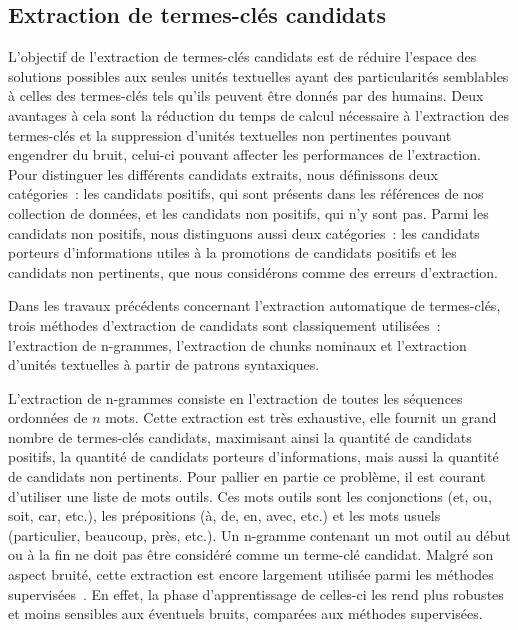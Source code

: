   \subsection{Extraction de termes-clés candidats}
  \label{subsec:extraction_de_termes_cles_candidats}
    L'objectif de l'extraction de termes-clés candidats est de réduire l'espace
    des solutions possibles aux seules unités textuelles ayant des
    particularités semblables à celles des termes-clés tels qu'ils peuvent être
    donnés par des humains. Deux avantages à cela sont la réduction du temps de
    calcul nécessaire à l'extraction des termes-clés et la suppression d'unités
    textuelles non pertinentes pouvant engendrer du bruit, celui-ci pouvant
    affecter les performances de l'extraction. Pour distinguer les différents
    candidats extraits, nous définissons deux catégories~: les candidats
    positifs, qui sont présents dans les références de nos collection de
    données, et les candidats non positifs, qui n'y sont pas. Parmi les
    candidats non positifs, nous distinguons aussi deux catégories~: les
    candidats porteurs d'informations utiles à la promotions de candidats
    positifs et les candidats non pertinents, que nous considérons comme des
    erreurs d'extraction.

    Dans les travaux précédents concernant l'extraction automatique de
    termes-clés, trois méthodes d'extraction de candidats sont classiquement
    utilisées~: l'extraction de n-grammes, l'extraction de chunks nominaux et
    l'extraction d'unités textuelles à partir de patrons syntaxiques.

    L'extraction de n-grammes consiste en l'extraction de toutes les séquences
    ordonnées de $n$ mots. Cette extraction est très exhaustive, elle fournit
    un grand nombre de termes-clés candidats, maximisant ainsi la quantité de
    candidats positifs, la quantité de candidats porteurs d'informations, mais
    aussi la quantité de candidats non pertinents. Pour pallier en partie ce
    problème, il est courant d'utiliser une liste de mots outils. Ces mots
    outils sont les conjonctions (et, ou, soit, car, etc.), les prépositions (à,
    de, en, avec, etc.) et les mots usuels (particulier, beaucoup, près, etc.).
    Un n-gramme contenant un mot outil au début ou à la fin ne doit pas être
    considéré comme un terme-clé candidat. Malgré son aspect bruité, cette
    extraction est encore largement utilisée parmi les méthodes
    supervisées~\cite{witten1999kea,turney1999learningalgorithms,hulth2003keywordextraction}.
    En effet, la phase d'apprentissage de celles-ci les rend plus robustes et
    moins sensibles aux éventuels bruits, comparées aux méthodes supervisées.

